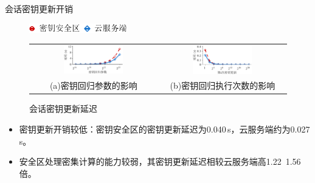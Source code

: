 \documentclass{beamer}
\begin{document}
\begin{frame}{会话密钥更新开销}
    \begin{figure}[!htb]
        \centering
        \includegraphics[height=11pt]{../pic/sgxdedup/plot/exp_a5/expa5_keyRegression_time_legend.pdf}
        \begin{tabular}{@{\ }c@{\ }c}
            \includegraphics[width=0.49\textwidth]{../pic/sgxdedup/plot/exp_a5/expa5_keyRegression_time.pdf} &
            \includegraphics[width=0.49\textwidth]{../pic/sgxdedup/plot/exp_a5/expa5_keyRegression_time_default.pdf} \\
            \mbox{\small (a)密钥回归参数的影响}                                                              &
            \mbox{\small (b)密钥回归执行次数的影响}
        \end{tabular}
        \caption{会话密钥更新延迟}
        \label{fig:sgxdedup-rekeyingLatency}
    \end{figure}
    \begin{itemize}
        \item 密钥更新开销较低：密钥安全区的密钥更新延迟为0.040\,s，云服务端约为0.027\,s。
        \item 安全区处理密集计算的能力较弱，其密钥更新延迟相较云服务端高1.22~1.56倍。
    \end{itemize}
\end{frame}
\end{document}
